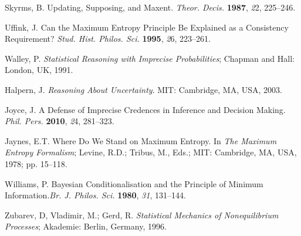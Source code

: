 \documentclass[entropy,article,accept,oneauthor,pdftex,12pt,a4paper]{mdpi}
\begin{document}
\begin{thebibliography}{----}
 Skyrms, B. Updating, Supposing, and Maxent. \emph{Theor. Decis.} {\bf1987}, {\emph22}, 225--246.

 Uffink, J. Can the Maximum Entropy Principle Be Explained as a Consistency Requirement? \emph{Stud. Hist. Philos. Sci.} {\bf1995}, {\emph26}, 223--261.

 Walley, P. \emph{Statistical Reasoning with Imprecise Probabilities}; Chapman and Hall: London, UK, 1991.

 Halpern, J. \emph{Reasoning About Uncertainty}.  MIT: Cambridge, MA, USA, 2003.

 Joyce, J. A Defense of Imprecise Credences in Inference and Decision Making. \emph{Phil. Pers.} {\bf2010}, {\emph24}, 281--323.

 Jaynes, E.T. Where Do We Stand on Maximum Entropy. In \emph{The Maximum Entropy Formalism};  Levine, R.D.;  Tribus, M., Eds.;  MIT: Cambridge, MA, USA, 1978; pp. 15--118.

 Williams, P. Bayesian Conditionalisation and the Principle of Minimum Information.\emph{Br. J. Philos. Sci.} {\bf1980}, \emph{31},  131--144.

 Zubarev, D, Vladimir, M.;  Gerd, R. \emph{Statistical Mechanics of Nonequilibrium Processes}; Akademie: Berlin, Germany, 1996.
\end{thebibliography}










% 

\end{document}

